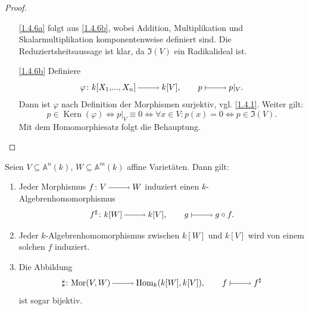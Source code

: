 \documentclass[a4paper,12pt,index=toc]{scrbook}
\theoremstyle{keinenummern} %
\def\A{\mathbb{A}}
\def\I{\mathfrak{I}}
\newcommand{\Hom}{\mathrm{Hom}}
\newcommand{\Mor}{\mathrm{Mor}}
\newcommand{\Kern}{\operatorname{Kern}}
\renewcommand{\phi}{\varphi}
\newcommand{\restrict}[1]{|_{#1}}
\renewcommand{\dotsc}{\ensuremath{\!...}}
\newcommand{\polyx}[1][n]{\ensuremath%
  [X_{1},\dotsc,X_{#1}]}
\begin{document}
\begin{proof}
\begin{enumerate}
\item[\ref{1.4.6a}] folgt aus \ref{1.4.6b}, wobei Addition, Multiplikation und Skalarmultiplikation komponentenweise definiert sind. Die Reduziertsheitsaussage ist klar, da $\I(V)$ ein Radikalideal ist.
\item[\ref{1.4.6b}] Definiere
\begin{equation*}\phi\colon  k\polyx\ra k[V],  \qquad p\mapsto p\restrict{V}.\end{equation*}
Dann ist $\phi$ nach Definition der Morphismen surjektiv, vgl. \cref{1.4.1}. Weiter gilt:
\begin{equation*}p \in \Kern(\phi) \iff p\restrict{V} \equiv 0 \iff \forall x\in V\colon p(x)=0 \iff p\in \I(V).\end{equation*} 
Mit dem Homomorphiesatz folgt die Behauptung. 
\end{enumerate}
\end{proof}

\begin{bem}\label{1.4.7} Seien $V\subseteq \A^n(k)$, $W\subseteq \A^m(k)$ affine Varietäten. Dann gilt:
\begin{enumerate}
\item{} Jeder Morphismus $f\colon V\ra W$ induziert einen $k$-Algebrenhomomorphismus
\begin{equation*}f^\sharp\colon  k[W]\ra k[V], \qquad g\mapsto g\circ f.\end{equation*}
\item{} Jeder $k$-Algebrenhomomorphismus zwischen $k[W]$ und $k[V]$ wird von einem solchen $f$ induziert.
\item{} Die Abbildung 
\begin{equation*}\sharp\colon \Mor(V,W)\ra \Hom_k(k[W],k[V]), \qquad f\mapsto f^{\sharp}\end{equation*}
ist sogar bijektiv.
\end{enumerate}
\end{bem}
\end{document}
